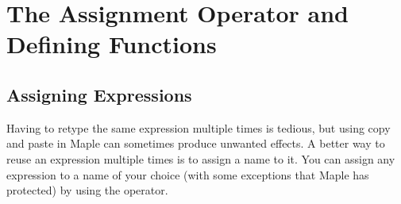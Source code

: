 \chapter{The Assignment Operator and Defining Functions}
\label{chp:assignment_operator}

\section{Assigning Expressions}
\label{sec:assigning_expressions}

Having to retype the same expression multiple times is tedious, but using copy and paste in Maple can sometimes produce unwanted effects. A better way to reuse an expression multiple times is to assign a name to it. You can assign any expression to a name of your choice (with some exceptions that Maple has protected) by using the \text{:=} operator.

\begin{maplegroup}
\begin{mapleinput}
\end{mapleinput}
\mapleresult
\begin{maplelatex}
\end{maplelatex}
\end{maplegroup}

\begin{maplegroup}
\begin{mapleinput}
\end{mapleinput}
\mapleresult
\begin{maplelatex}
\end{maplelatex}
\end{maplegroup}

\begin{maplegroup}
\begin{mapleinput}
\end{mapleinput}
\mapleresult
\begin{maplelatex}
\end{maplelatex}
\end{maplegroup}


